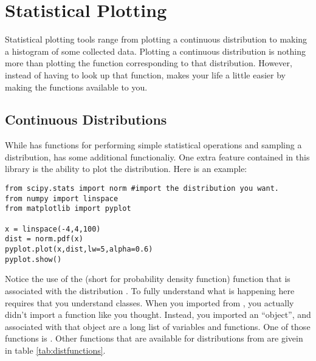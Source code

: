 \section{Statistical Plotting}
Statistical plotting tools range from plotting a continuous
distribution to making a histogram of some collected data.  Plotting a
continuous distribution is nothing more than plotting the function
corresponding to that distribution.  However, instead of having to
look up that function,  makes your life a little easier by
making the functions available to you.


\subsection*{Continuous Distributions}
While  has functions for performing simple statistical
operations and sampling a distribution,  has some
additional functionaliy.  One extra feature contained in this library
is the ability to plot the distribution.  Here is an example:


\begin{Verbatim}
from scipy.stats import norm #import the distribution you want.
from numpy import linspace
from matplotlib import pyplot

x = linspace(-4,4,100)
dist = norm.pdf(x)
pyplot.plot(x,dist,lw=5,alpha=0.6)
pyplot.show()
\end{Verbatim}

Notice the use of the  (short for probability density
function) function that is associated with the distribution
.  To fully understand what is happening here requires that
you understand classes.  When you imported  from
, you actually didn't import a function like you
thought.  Instead, you imported an ``object'', and associated with
that object are a long list of variables and functions.
  One of those
functions is .  Other functions that are available for
distributions from  are givein in table
\ref{tab:distfunctions}.


